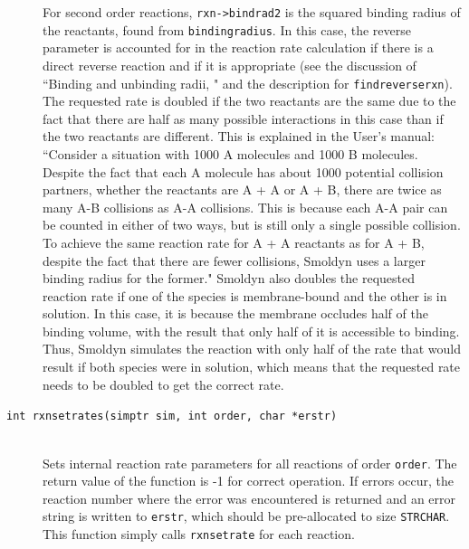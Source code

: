 \documentclass {scrbook}
\newcommand {\ttt} {\texttt}
\begin{document}
\begin{description}
For second order reactions, \ttt{rxn->bindrad2} is the squared binding radius of the reactants, found from \ttt{bindingradius}. In this case, the reverse parameter is accounted for in the reaction rate calculation if there is a direct reverse reaction and if it is appropriate (see the discussion of ``Binding and unbinding radii, " and the description for \ttt{findreverserxn}). The requested rate is doubled if the two reactants are the same due to the fact that there are half as many possible interactions in this case than if the two reactants are different. This is explained in the User's manual: ``Consider a situation with 1000 A molecules and 1000 B molecules. Despite the fact that each A molecule has about 1000 potential collision partners, whether the reactants are A + A or A + B, there are twice as many A-B collisions as A-A collisions. This is because each A-A pair can be counted in either of two ways, but is still only a single possible collision. To achieve the same reaction rate for A + A reactants as for A + B, despite the fact that there are fewer collisions, Smoldyn uses a larger binding radius for the former." Smoldyn also doubles the requested reaction rate if one of the species is membrane-bound and the other is in solution. In this case, it is because the membrane occludes half of the binding volume, with the result that only half of it is accessible to binding. Thus, Smoldyn simulates the reaction with only half of the rate that would result if both species were in solution, which means that the requested rate needs to be doubled to get the correct rate.

\item[\ttt{int rxnsetrates(simptr sim, int order, char *erstr)}]
\hfill \\
Sets internal reaction rate parameters for all reactions of order \ttt{order}. The return value of the function is -1 for correct operation. If errors occur, the reaction number where the error was encountered is returned and an error string is written to \ttt{erstr}, which should be pre-allocated to size \ttt{STRCHAR}. This function simply calls \ttt{rxnsetrate} for each reaction.


\end{description}
\end{document}
